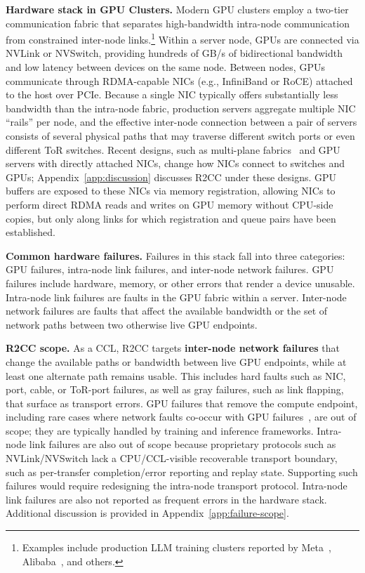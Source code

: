 \documentclass[letterpaper,twocolumn,10pt]{article}
\begin{document}
\noindent\textbf{Hardware stack in GPU Clusters.}
Modern GPU clusters employ a two-tier communication fabric that separates high-bandwidth intra-node communication from constrained inter-node links.\footnote{Examples include production LLM training clusters reported by Meta~\cite{gangidi2024rdma}, Alibaba~\cite{qian2024alibaba}, and others.}
Within a server node, GPUs are connected via NVLink or NVSwitch, providing hundreds of GB/s of bidirectional bandwidth and low latency between devices on the same node.
Between nodes, GPUs communicate through RDMA-capable NICs (e.g., InfiniBand or RoCE) attached to the host over PCIe.
Because a single NIC typically offers substantially less bandwidth than the intra-node fabric, production servers aggregate multiple NIC ``rails'' per node, and the effective inter-node connection between a pair of servers consists of several physical paths that may traverse different switch ports or even different ToR switches.
Recent designs, such as multi-plane fabrics~\cite{qian2024alibaba,oci-multiplanar,khashab2026high} and GPU servers with directly attached NICs, change how NICs connect to switches and GPUs; Appendix~\ref{app:discussion} discusses R2CC under these designs.
GPU buffers are exposed to these NICs via memory registration, allowing NICs to perform direct RDMA reads and writes on GPU memory without CPU-side copies, but only along links for which registration and queue pairs have been established.

\smallskip\noindent\textbf{Common hardware failures.}
Failures in this stack fall into three categories: GPU failures, intra-node link failures, and inter-node network failures. GPU failures include hardware, memory, or other errors that render a device unusable. Intra-node link failures are faults in the GPU fabric within a server. Inter-node network failures are faults that affect the available bandwidth or the set of network paths between two otherwise live GPU endpoints.

\smallskip\noindent\textbf{R2CC scope.}
As a CCL, R2CC targets \textbf{inter-node network failures} that change the available paths or bandwidth between live GPU endpoints, while at least one alternate path remains usable. This includes hard faults such as NIC, port, cable, or ToR-port failures, as well as gray failures, such as link flapping, that surface as transport errors. GPU failures that remove the compute endpoint, including rare cases where network faults co-occur with GPU failures~\cite{Revisiting_Reliability}, are out of scope; they are typically handled by training and inference frameworks. Intra-node link failures are also out of scope because proprietary protocols such as NVLink/NVSwitch lack a CPU/CCL-visible recoverable transport boundary, such as per-transfer completion/error reporting and replay state. Supporting such failures would require redesigning the intra-node transport protocol. Intra-node link failures are also not reported as frequent errors in the hardware stack. Additional discussion is provided in Appendix~\ref{app:failure-scope}.
\end{document}
